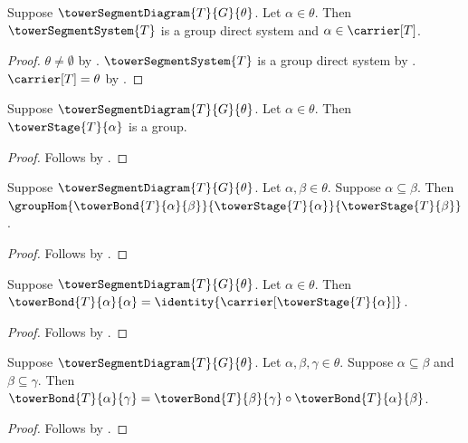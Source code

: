 \begin{proposition}\label{tower_segment_index_context}
    Suppose $\towerSegmentDiagram{T}{G}{\theta}$.
    Let $\alpha\in\theta$.
    Then $\towerSegmentSystem{T}$ is a group direct system and
        $\alpha\in\carrier[T]$.
\end{proposition}
\begin{proof}
    $\theta\neq\emptyset$ by .
    $\towerSegmentSystem{T}$ is a group direct system by
        .
    $\carrier[T]=\theta$ by
        .
\end{proof}

\begin{proposition}\label{tower_segment_stage_is_group}
    Suppose $\towerSegmentDiagram{T}{G}{\theta}$.
    Let $\alpha\in\theta$.
    Then $\towerStage{T}{\alpha}$ is a group.
\end{proposition}
\begin{proof}
    Follows by
        .
\end{proof}

\begin{proposition}\label{tower_segment_bond_is_hom}
    Suppose $\towerSegmentDiagram{T}{G}{\theta}$.
    Let $\alpha,\beta\in\theta$.
    Suppose $\alpha\subseteq\beta$.
    Then $\groupHom{\towerBond{T}{\alpha}{\beta}}
        {\towerStage{T}{\alpha}}{\towerStage{T}{\beta}}$.
\end{proposition}
\begin{proof}
    Follows by
        .
\end{proof}

\begin{proposition}\label{tower_segment_bond_identity}
    Suppose $\towerSegmentDiagram{T}{G}{\theta}$.
    Let $\alpha\in\theta$.
    Then $\towerBond{T}{\alpha}{\alpha}=
        \identity{\carrier[\towerStage{T}{\alpha}]}$.
\end{proposition}
\begin{proof}
    Follows by
        .
\end{proof}

\begin{proposition}\label{tower_segment_bond_composition}
    Suppose $\towerSegmentDiagram{T}{G}{\theta}$.
    Let $\alpha,\beta,\gamma\in\theta$.
    Suppose $\alpha\subseteq\beta$ and $\beta\subseteq\gamma$.
    Then $\towerBond{T}{\alpha}{\gamma}=
        \towerBond{T}{\beta}{\gamma}\circ
            \towerBond{T}{\alpha}{\beta}$.
\end{proposition}
\begin{proof}
    Follows by
        .
\end{proof}

